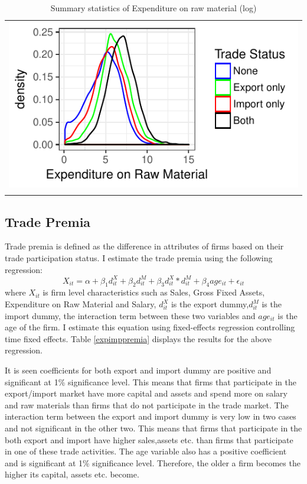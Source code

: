 \documentclass[11pt]{article}
\begin{document}
\begin{center}
\begin{table}[htp]
\caption{Summary statistics of Expenditure on raw material (log)}
\label{tab:lrawmat}
\begin{tabular}{c}
 \includegraphics{./PICS/denslrawmat.pdf}   \\ 
   \\  
\end{tabular}
\end{table}
\end{center}
\subsection{Trade Premia}
Trade premia is defined as the difference in
attributes of firms based on their trade participation status. I
estimate the trade premia using the following regression:
$$ X_{it} = \alpha + \beta_{1} d_{it}^{X}+ \beta_{2} d_{it}^{M}+
\beta_{3} d_{it}^{X}*d_{it}^{M} + \beta_{4} age_{it} + \epsilon_{it}$$
where $X_{it}$ is firm level characteristics such as Sales, Gross
Fixed Assets, Expenditure on Raw Material and Salary, $d_{it}^X$ is
the export dummy,$d_{it}^M$ is
the import  dummy, the interaction term between these two variables
and $age_{it}$ is the age of the firm. I estimate this equation using
fixed-effects regression controlling time fixed
effects. Table \ref{expimppremia} displays the results for the above
regression. 
\begin{center}

\end{center}
It is seen coefficients for both export and import dummy are positive
and significant at 1\% significance level. This means that firms that
participate in the export/import market have more capital and assets
and spend more on salary and raw materials than firms that do not
participate in the trade market. The interaction term between the
export and import dummy is very low in two cases and not significant
in the other two. This means that firms that participate in the both
export and import have  higher sales,assets etc. than firms that
participate in one of these trade activities. The age variable also
has a positive coefficient and is significant at 1\% significance
level. Therefore, the older a firm becomes the higher its capital,
assets etc. become. 
\end{document}
